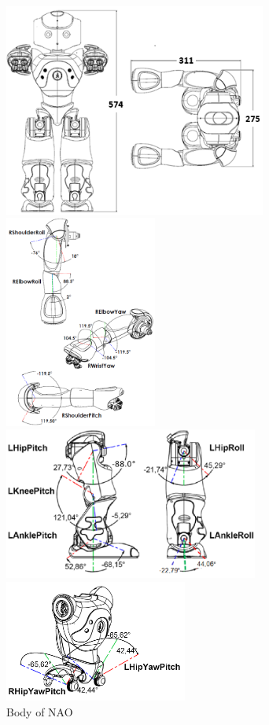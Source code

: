 \begin{figure}
	\begin{minipage}
		{.6
			\textwidth} 
		\includegraphics[height=7cm]{figures/content/nao-body.png} 
	\end{minipage}
	\begin{minipage}
		{.4 
			\textwidth} 
		\includegraphics[height=7cm]{figures/content/nao-hand.png} 
	\end{minipage}
	\begin{minipage}
		{.6 
			\textwidth} 
		\includegraphics[height=50mm]{figures/content/nao-leg.png} 
	\end{minipage}
	\begin{minipage}
		{.4 
			\textwidth} 
		\includegraphics[height=40mm]{figures/content/nao-hip.png} 
	\end{minipage}
	\caption{Body of NAO} \label{fg:nao:body} 
\end{figure}
